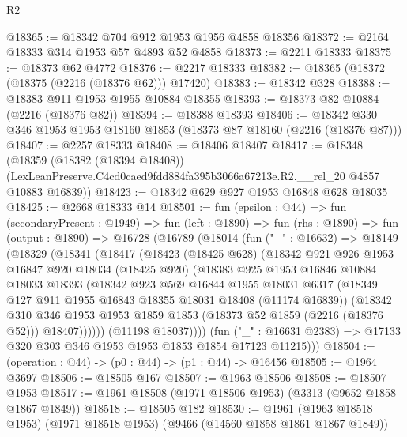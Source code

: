 \begin{lexlean}{R2}
\begin{coremodule}
@18365 := @18342 @704 @912 @1953 @1956 @4858 @18356
@18372 := @2164 @18333 @314 @1953 @57 @4893 @52 @4858
@18373 := @2211 @18333
@18375 := @18373 @62 @4772
@18376 := @2217 @18333
@18382 := @18365 (@18372 (@18375 (@2216 (@18376 @62))) @17420)
@18383 := @18342 @328
@18388 := @18383 @911 @1953 @1955 @10884 @18355
@18393 := @18373 @82 @10884 (@2216 (@18376 @82))
@18394 := @18388 @18393
@18406 := @18342 @330 @346 @1953 @1953 @18160 @1853 (@18373 @87 @18160 (@2216 (@18376 @87)))
@18407 := @2257 @18333
@18408 := @18406 @18407
@18417 := @18348
    (@18359
      (@18382 (@18394 @18408))
      (LexLeanPreserve.C4cd0caed9fdd884fa395b3066a67213e.R2.__rel_20 @4857 @10883 @16839))
@18423 := @18342 @629 @927 @1953 @16848 @628 @18035
@18425 := @2668 @18333 @14
@18501 := fun (epsilon : @44) =>
  fun (secondaryPresent : @1949) =>
  fun (left : @1890) =>
  fun (rhs : @1890) =>
  fun (output : @1890) =>
  @16728
    (@16789
      (@18014
        (fun ("_" : @16632) =>
        @18149
          (@18329
            (@18341
              (@18417
                (@18423
                  (@18425 @628)
                  (@18342
                    @921
                    @926
                    @1953
                    @16847
                    @920
                    @18034
                    (@18425 @920)
                    (@18383
                      @925
                      @1953
                      @16846
                      @10884
                      @18033
                      @18393
                      (@18342
                        @923
                        @569
                        @16844
                        @1955
                        @18031
                        @6317
                        (@18349 @127 @911 @1955 @16843 @18355 @18031 @18408 (@11174 @16839))
                        (@18342
                          @310
                          @346
                          @1953
                          @1953
                          @1859
                          @1853
                          (@18373 @52 @1859 (@2216 (@18376 @52)))
                          @18407))))))
              (@11198 @18037))))
        (fun ("_" : @16631 @2383) => @17133 @320 @303 @346 @1953 @1953 @1853 @1854 @17123 @11215)))
@18504 := (operation : @44) -> (p0 : @44) -> (p1 : @44) -> @16456
@18505 := @1964 @3697
@18506 := @18505 @167
@18507 := @1963 @18506
@18508 := @18507 @1953
@18517 := @1961 @18508 (@1971 @18506 @1953) (@3313 (@9652 @1858 @1867 @1849))
@18518 := @18505 @182
@18530 := @1961 (@1963 @18518 @1953) (@1971 @18518 @1953) (@9466 (@14560 @1858 @1861 @1867 @1849))

\end{coremodule}
\end{lexlean}
